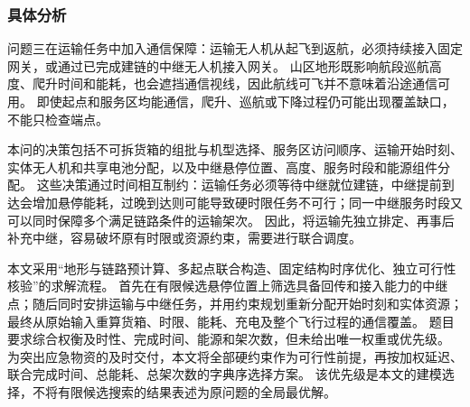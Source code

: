 \subsubsection{具体分析}
\label{sec:q3:analysis}

问题三在运输任务中加入通信保障：运输无人机从起飞到返航，必须持续接入固定网关，或通过已完成建链的中继无人机接入网关。
山区地形既影响航段巡航高度、爬升时间和能耗，也会遮挡通信视线，因此航线可飞并不意味着沿途通信可用。
即使起点和服务区均能通信，爬升、巡航或下降过程仍可能出现覆盖缺口，不能只检查端点。

本问的决策包括不可拆货箱的组批与机型选择、服务区访问顺序、运输开始时刻、实体无人机和共享电池分配，以及中继悬停位置、高度、服务时段和能源组件分配。
这些决策通过时间相互制约：运输任务必须等待中继就位建链，中继提前到达会增加悬停能耗，过晚到达则可能导致硬时限任务不可行；同一中继服务时段又可以同时保障多个满足链路条件的运输架次。
因此，将运输先独立排定、再事后补充中继，容易破坏原有时限或资源约束，需要进行联合调度。

本文采用“地形与链路预计算、多起点联合构造、固定结构时序优化、独立可行性核验”的求解流程。
首先在有限候选悬停位置上筛选具备回传和接入能力的中继点；随后同时安排运输与中继任务，并用约束规划重新分配开始时刻和实体资源；最终从原始输入重算货箱、时限、能耗、充电及整个飞行过程的通信覆盖。
题目要求综合权衡及时性、完成时间、能源和架次数，但未给出唯一权重或优先级。
为突出应急物资的及时交付，本文将全部硬约束作为可行性前提，再按加权延迟、联合完成时间、总能耗、总架次数的字典序选择方案。
该优先级是本文的建模选择，不将有限候选搜索的结果表述为原问题的全局最优解。
